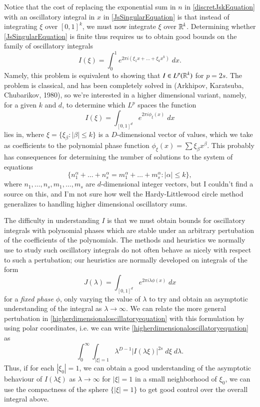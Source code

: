 	Notice that the cost of replacing the exponential sum in $n$ in \eqref{discretJskEquation} with an oscillatory integral in $x$ in \eqref{JsSingularEquation} is that instead of integrating $\xi$ over $[0,1]^k$, we must now integrate $\xi$ over $\operatorname{\mathbb{R}}^k$. Determining whether \eqref{JsSingularEquation} is finite thus requires us to obtain good bounds on the family of oscillatory integrals
	\begin{equation} \label{oscillatoryEquation}
		I(\xi) = \int_0^1 e^{2 \pi i (\xi_1 x + \dots + \xi_k x^k)}\; dx.
	\end{equation}
	Namely, this problem is equivalent to showing that $I \in L^p(\operatorname{\mathbb{R}}^k)$ for $p = 2s$. The problem is classical, and has been completely solved in (Arkhipov, Karatsuba, Chubarikov, 1980), so we're interested in a higher dimensional variant, namely, for a given $k$ and $d$, to determine which $L^p$ spaces the function
	\begin{equation} \label{higherdimensionaloscillatoryequation}
		I(\xi) = \int_{[0,1]^d} e^{2 \pi i \phi_\xi(x)}\; dx
	\end{equation}
	lies in, where $\xi = \{ \xi_\beta : |\beta| \leq k \}$ is a $D$-dimensional vector of values, which we take as coefficients to the polynomial phase function $\phi_\xi(x) = \sum \xi_\beta x^\beta$. This probably has consequences for determining the number of solutions to the system of equations
	\[ \{ n_1^\alpha + \dots + n_s^\alpha = m_1^\alpha + \dots + m_s^\alpha : |\alpha| \leq k \}, \]
	where $n_1,\dots,n_s,m_1,\dots,m_s$ are $d$-dimensional integer vectors, but I couldn't find a source on this, and I'm not sure how well the Hardy-Littlewood circle method generalizes to handling higher dimensional oscillatory sums.

	The difficulty in understanding $I$ is that we must obtain bounds for oscillatory integrals with polynomial phases which are stable under an arbitrary pertubation of the coefficients of the polynomials. The methods and heuristics we normally use to study such oscillatory integrals do not often behave as nicely with respect to such a pertubation; our heuristics are normally developed on integrals of the form
	\[ J(\lambda) = \int_{[0,1]^d} e^{2 \pi i \lambda \phi(x)}\; dx \]
	for a \emph{fixed phase} $\phi$, only varying the value of $\lambda$ to try and obtain an asymptotic understanding of the integral as $\lambda \to \infty$. We can relate the more general pertubation in \eqref{higherdimensionaloscillatoryequation} with this formulation by using polar coordinates, i.e. we can write \eqref{higherdimensionaloscillatoryequation} as
	\[ \int_0^\infty \int_{|\xi| = 1}  \lambda^{D-1}|I(\lambda \xi)|^{2s}\; d\xi\; d\lambda. \]
	Thus, if for each $|\xi_0| = 1$, we can obtain a good understanding of the asymptotic behaviour of $I(\lambda \xi)$ as $\lambda \to \infty$ for $|\xi| = 1$ in a small neighborhood of $\xi_0$, we can use the compactness of the sphere $\{ |\xi| = 1 \}$ to get good control over the overall integral above.

